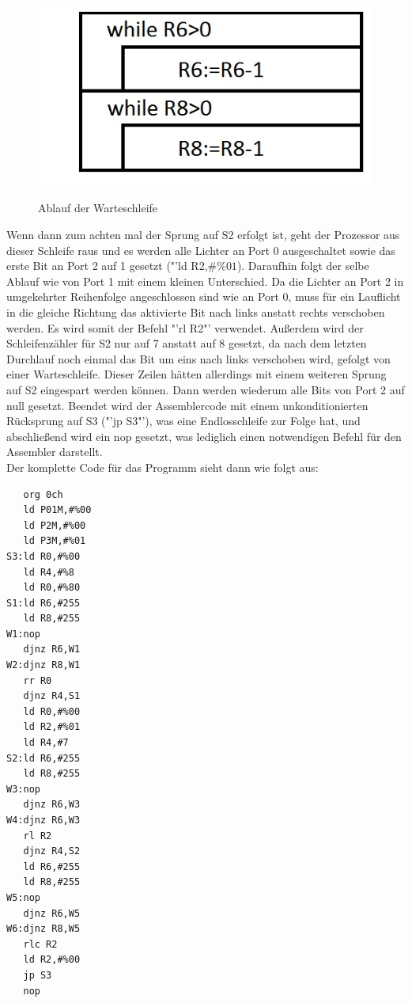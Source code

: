  \begin{figure}[!ht]
\centering %
\scalebox{0.5} %
{\includegraphics{struk32.jpg}} %
\caption{Ablauf der Warteschleife} \label{Zählschleife}
\end{figure}

Wenn dann zum achten mal der Sprung auf S2 erfolgt ist, geht der Prozessor aus dieser Schleife raus und es werden alle Lichter an Port 0 ausgeschaltet sowie das erste Bit an Port 2 auf 1 gesetzt ("'ld R2,$\#\%01$). Daraufhin folgt der selbe Ablauf wie von Port 1 mit einem kleinen Unterschied. Da die Lichter an Port 2 in umgekehrter Reihenfolge angeschlossen sind wie an Port 0, muss für ein Lauflicht in die gleiche Richtung das aktivierte Bit nach links anstatt rechts verschoben werden. Es wird somit der Befehl "'rl R2"' verwendet. Außerdem wird der Schleifenzähler für S2 nur auf 7 anstatt auf 8 gesetzt, da nach dem letzten Durchlauf noch einmal das Bit um eins nach links verschoben wird, gefolgt von einer Warteschleife. Dieser Zeilen hätten allerdings mit einem weiteren Sprung auf S2 eingespart werden können. Dann werden wiederum alle Bits von Port 2 auf null gesetzt. Beendet wird der Assemblercode mit einem unkonditionierten Rücksprung auf S3 ("'jp S3"'), was eine Endlosschleife zur Folge hat, und abschließend wird ein nop gesetzt, was lediglich einen notwendigen Befehl für den Assembler darstellt.\\
Der komplette Code für das Programm sieht dann wie folgt aus:

\begin{verbatim}
   org 0ch
   ld P01M,#%00
   ld P2M,#%00
   ld P3M,#%01
S3:ld R0,#%00
   ld R4,#%8
   ld R0,#%80
S1:ld R6,#255
   ld R8,#255
W1:nop
   djnz R6,W1
W2:djnz R8,W1
   rr R0
   djnz R4,S1
   ld R0,#%00
   ld R2,#%01
   ld R4,#7
S2:ld R6,#255
   ld R8,#255
W3:nop
   djnz R6,W3
W4:djnz R6,W3
   rl R2
   djnz R4,S2
   ld R6,#255
   ld R8,#255
W5:nop 
   djnz R6,W5
W6:djnz R8,W5
   rlc R2
   ld R2,#%00
   jp S3
   nop
\end{verbatim}

